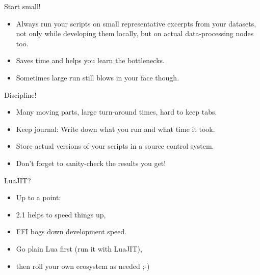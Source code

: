 \documentclass[handout]{beamer}
\begin{document}

\begin{frame}{Start small!}

\begin{itemize}
\item Always run your scripts on small representative excerpts
      from your datasets, not only while developing them locally,
      but on actual data-processing nodes too.
\item Saves time and helps you learn the bottlenecks.
\item Sometimes large run still blows in your face though.
\end{itemize}

\end{frame}


\begin{frame}{Discipline!}

\begin{itemize}
\item Many moving parts, large turn-around times, hard to keep tabs.
\item Keep journal: Write down what you run and what time it took.
\item Store actual versions of your scripts in a source control system.
\item Don't forget to sanity-check the results you get!
\end{itemize}

\end{frame}


\begin{frame}{LuaJIT?}

\begin{itemize}
\item Up to a point:
\item 2.1 helps to speed things up,
\item FFI bogs down development speed.
\item Go plain Lua first (run it with LuaJIT),
\item then roll your own ecosystem as needed ;-)
\end{itemize}

\end{frame}
\end{document}
